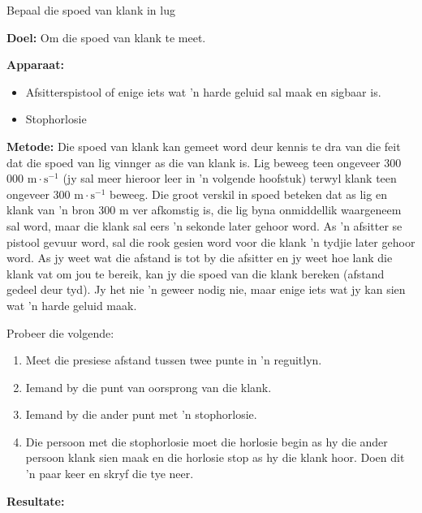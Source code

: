 \vspace*{-0.5cm}
\begin{i_experiment}{Bepaal die spoed van klank in lug}

\textbf{Doel:} Om die spoed van klank te meet.

\textbf{Apparaat:} 
\begin{itemize}
 \item Afsitterspistool of enige iets wat 'n harde geluid sal maak en sigbaar is. 
  \item Stophorlosie
  \end{itemize}

\textbf{Metode:}
Die spoed van klank kan gemeet word deur kennis te dra van die feit dat die spoed van lig vinnger as die van klank is. Lig beweeg teen ongeveer 300 000 $\text{m}\cdot\text{s}^{-1}$ (jy sal meer hieroor leer in 'n volgende hoofstuk) terwyl klank teen ongeveer 300 $\text{m}\cdot\text{s}^{-1}$ beweeg. Die groot verskil in spoed beteken dat as lig en klank van 'n bron 300 $\text{m}$ ver afkomstig is, die lig byna onmiddellik waargeneem sal word, maar die klank sal eers 'n sekonde later gehoor word. As 'n afsitter se pistool gevuur word, sal die rook gesien word voor die klank 'n tydjie later gehoor word. As jy weet wat die afstand is tot by die afsitter en jy weet hoe lank die klank vat om jou te bereik,  kan jy die spoed van die klank bereken (afstand gedeel deur tyd). Jy het nie 'n geweer nodig nie, maar enige iets wat jy kan sien wat 'n harde geluid maak.    


Probeer die volgende:
\begin{enumerate}[noitemsep, label=\textbf{\arabic*}. ] 
\item Meet die presiese afstand tussen twee punte in 'n reguitlyn.
\item Iemand by die punt van oorsprong van die klank.
\item Iemand by die ander punt met 'n stophorlosie.
\item Die persoon met die stophorlosie moet die horlosie begin as hy die ander persoon klank sien maak en die horlosie stop as hy die klank hoor. Doen dit 'n paar keer en skryf die tye neer. 

\end{enumerate}

\textbf{Resultate:}


\end{i_experiment}
